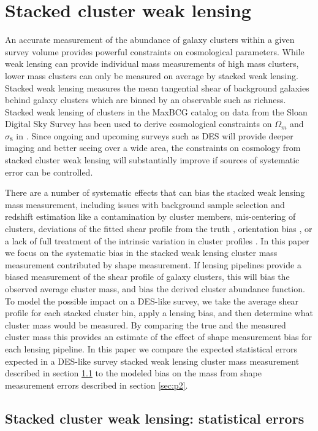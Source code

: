 \documentclass[useAMS,usenatbib]{mn2e}
\begin{document}
\section{Stacked cluster weak lensing}
An accurate measurement of the abundance of galaxy clusters within a
given survey volume provides powerful constraints on cosmological
parameters.  While weak lensing can provide individual mass
measurements of high mass clusters, lower mass clusters can only be
measured on average by stacked weak lensing. Stacked weak lensing
measures the mean tangential shear of  background galaxies behind
galaxy clusters which are binned by an observable such as
richness. Stacked weak lensing
of clusters in the MaxBCG catalog \citep{Koester, Eshel} on data from the 
Sloan Digital Sky Survey \citep{York} has been used to derive
cosmological constraints on $\Omega_m$ and $\sigma_8$ in
\citep{Ying, ERozo}. Since ongoing and upcoming surveys such as DES  will provide deeper
imaging and better seeing over a wide area, the constraints on cosmology
from stacked cluster weak lensing will substantially improve if
sources of systematic error can be controlled.

There are a number of systematic effects that can bias the
stacked weak lensing mass measurement, including issues with background sample selection and redshift estimation like a contamination by cluster members, mis-centering of clusters, deviations of the fitted shear profile from the truth \citep[e.g.][]{mbecker}, orientation bias \citep{Joerg}, or a lack of full treatment of the intrinsic variation in cluster profiles \citep{ccv}. In this paper we focus
on the systematic bias in the stacked weak lensing cluster
mass measurement contributed by shape measurement. If lensing
pipelines provide a biased measurement of the shear profile of galaxy
clusters, this will bias the observed average cluster mass, and bias
the derived cluster abundance function. To model the possible
impact on a DES-like survey, we take the
average shear profile for each stacked cluster bin, apply a lensing
bias, and then determine what cluster mass would be measured. 
By comparing the true and the measured cluster
mass this provides an estimate of the effect of shape measurement bias
for each lensing pipeline. In this paper we compare the expected statistical errors
expected in a DES-like survey stacked weak lensing cluster mass measurement
described in section \ref{sec:p1} to the modeled bias on the mass
from shape measurement errors described in section \ref{sec:p2}.

\subsection{Stacked cluster weak lensing: statistical errors}\label{sec:p1}

\end{document}

